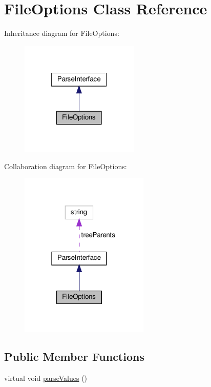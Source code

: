 \hypertarget{classFileOptions}{}\section{File\+Options Class Reference}
\label{classFileOptions}


Inheritance diagram for File\+Options\+:
\nopagebreak
\begin{figure}[H]
\begin{center}
\leavevmode
\includegraphics[width=160pt]{classFileOptions__inherit__graph}
\end{center}
\end{figure}


Collaboration diagram for File\+Options\+:
\nopagebreak
\begin{figure}[H]
\begin{center}
\leavevmode
\includegraphics[width=174pt]{classFileOptions__coll__graph}
\end{center}
\end{figure}
\subsection*{Public Member Functions}
\begin{DoxyCompactItemize}
\item 
virtual void \hyperlink{classFileOptions_aca2f6304ed7d1fdde5c6c392d7fd11b9}{parse\+Values} ()
\end{DoxyCompactItemize}
